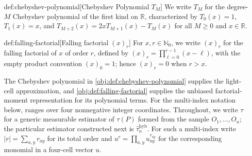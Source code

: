 \begin{definitionv}{def:chebyshev-polynomial}[Chebyshev Polynomial $T_M$]
We write $T_M$ for the degree-$M$ Chebyshev polynomial of the first kind on $\mathbb R$, characterized by $T_0(x)=1$, $T_1(x)=x$, and $T_{M+2}(x)=2xT_{M+1}(x)-T_M(x)$ for all $M\ge0$ and $x\in\mathbb R$.
\end{definitionv}

\begin{definitionv}{def:falling-factorial}[Falling factorial \((x)_r\)]
For \(x,r\in\mathbb N_0\), we write \((x)_r\) for the falling factorial of \(x\) of order \(r\), defined by \((x)_r=\prod_{\ell=0}^{r-1}(x-\ell)\), with the empty product convention \((x)_0=1\); hence \((x)_r=0\) when \(r>x\).
\end{definitionv}

The Chebyshev polynomial in \cref{obj:def:chebyshev-polynomial} supplies the light-cell approximation, and \cref{obj:def:falling-factorial} supplies the unbiased factorial-moment representation for its polynomial terms. For the multi-index notation below,  ranges over four nonnegative integer coordinates. Throughout, we write \(\widehat\tau\) for a generic measurable estimator of \(\tau(P)\) formed from the sample \(O_1,\ldots,O_n\); the particular estimator constructed next is \(\widehat\tau_n^{\mathrm{hyb}}\). For such a multi-index write \(|r|=\sum_{a,y}r_{ay}\) for its total order and \(u^r=\prod_{a,y}u_{ay}^{r_{ay}}\) for the corresponding monomial in a four-cell vector \(u\).

